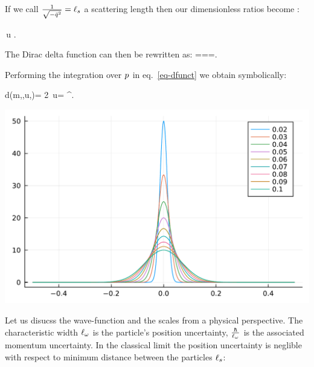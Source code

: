 \documentclass[
  11pt,
  a4paper,
  DIV=11,
  numbers=noendperiod,
  oneside]{scrreprt}
\let\[\relax \let\]\relax %
\DeclareRobustCommand{\[}{\begin{equation}}
\DeclareRobustCommand{\]}{\end{equation}}
\begin{document}
If we call \(\frac{1}{\sqrt{-\bar{q}_{}^2}}=\ell_s\) a scattering
length then
our dimensionless ratios become :

\[\frac{\comptlen}{\scatlen} \quad {}\quad \scatlen\,\tw \cdot u .\]

The Dirac delta function can then be rewritten as: \[
===.
\]

Performing the integration over \(p_{}\) in eq.~\ref{eq-dfunct} we
obtain symbolically:

\[
d(m,\xi,u,\tm)= {2\scatlen\, \tw \cdot u=\frac{\comptlen}{\scatlen}} \xi^\beta.
\]

\begin{marginfigure}


{\centering \includegraphics{./scattering_files/figure-pdf/fig-gaussian-output-1.pdf}

}

\end{marginfigure}

Let us disucss the wave-function and the scales from a physical
perspective. The characteristic width \(\ell_\omega\) is the particle's
position uncertainty, \(\frac{\hbar}{\ell_\omega}\) is the associated
momentum uncertainty. In the classical limit the position uncertainty is
neglible with respect to minimum distance between the particles
\(\ell_s\):
\end{document}
